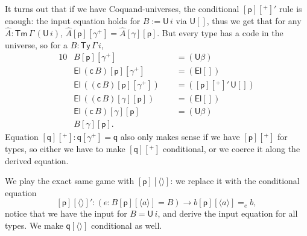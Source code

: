 \documentclass[sigplan,10pt,anonymous,review]{acmart}\settopmatter{printfolios=true,printccs=false,printacmref=false}
\newcommand{\ra}{\rightarrow}
\newcommand{\Ty}{\mathsf{Ty}}
\newcommand{\Tm}{\mathsf{Tm}}
\newcommand{\p}{\mathsf{p}}
\newcommand{\q}{\mathsf{q}}
\newcommand{\U}{\mathsf{U}}
\newcommand{\El}{\mathsf{El}}
\newcommand{\cd}{\mathsf{c}}
\begin{document}
It turns out that if we have Coquand-universes, the conditional
$[\p][^+]'$ rule is enough: the input equation holds for $B := \U\,i$
via $\U[]$, thus we get that for any $\hat{A} : \Tm\,\Gamma\,(\U\,i)$,
$\hat{A}[\p][\gamma^+] = \hat{A}[\gamma][\p]$. But every type has a
code in the universe, so for a $B : \Ty\,\Gamma\,i$,
\begin{alignat*}{10}
  & B[\p][\gamma^+] && {=}(\U\beta) \\
  & \El\,(\cd\,B)[\p][\gamma^+] && {=}(\El[]) \\
  & \El\,((\cd\,B)[\p][\gamma^+])\,\, && {=}([\p][^+]'\,\U[]) \\
  & \El\,((\cd\,B)[\gamma][\p]) && {=}(\El[]) \\
  & \El\,(\cd\,B)[\gamma][\p] && {=}(\U\beta) \\
  & B[\gamma][\p].
\end{alignat*}
Equation $[\q][^+] : \q[\gamma^+] = \q$ also only makes sense if we
have $[\p][^+]$ for types, so either we have to make $[\q][^+]$
conditional, or we coerce it along the derived equation.

We play the exact same game with $[\p][\langle\rangle]$: we replace it
with the conditional equation
\[
[\p][\langle\rangle]' : (e:B[\p][\langle a\rangle] = B)\ra b[\p][\langle a\rangle] =_e b,
\]
notice that we have the input for $B = \U\,i$, and derive the input
equation for all types. We make $\q[\langle\rangle]$ conditional as
well.
\end{document}
